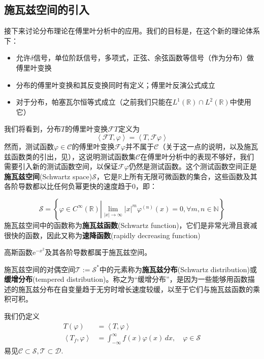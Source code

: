 \subsection{施瓦兹空间的引入}\label{sub:schwartz}
接下来讨论分布理论在傅里叶分析中的应用。我们的目标是，在这个新的理论体系下：
\begin{itemize}
    \item 允许$\delta$信号，单位阶跃信号，多项式，正弦、余弦函数等信号（作为分布）做傅里叶变换
    \item 分布的傅里叶变换和其反变换同时有定义；傅里叶反演公式成立
    \item 对于分布，帕塞瓦尔恒等式成立（之前我们只能在$L^1(\mathbb{R})\cap L^2(\mathbb{R})$中使用它）
\end{itemize}
我们将看到，分布$T$的傅里叶变换$\mathcal{F} T$定义为
\begin{equation}
    \left\langle\mathcal{F}T,\varphi\right\rangle=\left\langle T,\mathcal{F}\varphi\right\rangle
\end{equation}
然而，测试函数$\varphi\in\mathcal{C} $的傅里叶变换$\mathcal{F}\varphi$并不属于$\mathcal{C} $（关于这一点的说明，以及施瓦兹函数类的引出，见），这说明测试函数集$\mathcal{C} $在傅里叶分析中的表现不够好，我们需要引入新的测试函数空间，以保证$\mathcal{F}\varphi$仍然是测试函数。这个测试函数空间正是\textbf{施瓦兹空间}(Schwartz space)$\mathcal{S} $\cite{brad_osgood_ee261}，它是$\mathbb{R}$上所有无限可微函数的集合，这些函数及其各阶导数都以比任何负幂更快的速度趋于0，即：
\begin{definition}[施瓦兹空间与施瓦兹函数]\label{def:schwartz}
    \[\mathcal{S} =\left\{\varphi\in C^{\infty}(\mathbb{R} )\left|\lim_{|x|\to\infty}|x|^m\varphi^{(n)}(x)=0,\forall m,n\in\mathbb{N} \right.\right\}\]
    施瓦兹空间中的函数称为\textbf{施瓦兹函数}(Schwartz function)，它们是非常光滑且衰减很快的函数，因此又称为\textbf{速降函数}(rapidly decreasing function)
\end{definition}
\begin{example}
高斯函数$\mathrm{e}^{-x^2}$及其各阶导数都属于施瓦兹空间。
\end{example}
\begin{definition}[施瓦兹分布]
    施瓦兹空间的对偶空间$\mathcal{T}:=\mathcal{S}^*$中的元素称为\textbf{施瓦兹分布}(Schwartz distribution)或\textbf{缓增分布}(tempered distribution)。称之为“缓增分布”，是因为一些能够用函数描述的施瓦兹分布在自变量趋于无穷时增长速度较缓，以至于它们与施瓦兹函数的乘积可积。
\end{definition}
我们仍定义
\begin{align}
    T(\varphi)                 & =\left\langle T,\varphi\right\rangle                                        \\
    \left\langle T_f,\varphi\right\rangle & =\int_{-\infty}^{\infty}f(x)\varphi(x)\,dx,\quad\varphi\in\mathcal{S}
\end{align}
易见$\mathcal{C} \subset \mathcal{S} ,\mathcal{T} \subset\mathcal{D}. $

